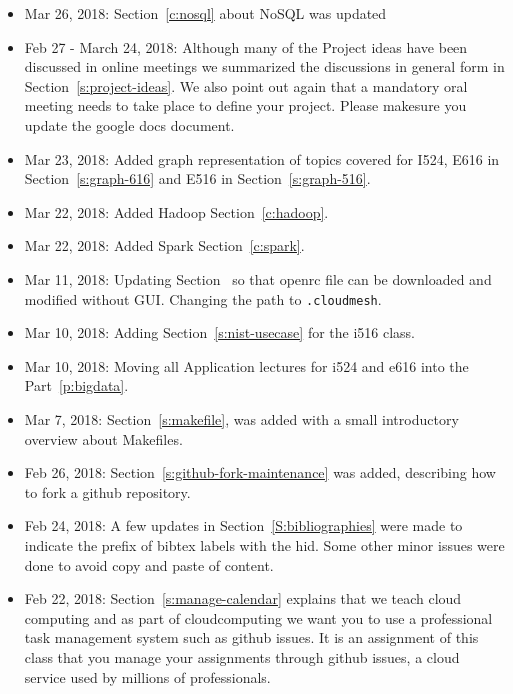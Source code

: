 \begin{itemize}
\item Mar 26, 2018: Section~\ref{c:nosql} about NoSQL was updated

\item Feb 27 - March 24, 2018: Although many of the Project ideas have been discussed
  in online meetings we summarized the discussions in general form in
  Section~\ref{s:project-ideas}.
  We also point out again that a mandatory oral meeting needs to take
  place to define your project. Please makesure you update the google
  docs document.

\item Mar 23, 2018: Added graph representation of topics covered for
  I524, E616 in Section~\ref{s:graph-616} and E516 in Section~\ref{s:graph-516}.

\item Mar 22, 2018: Added Hadoop Section~\ref{c:hadoop}.

\item Mar 22, 2018: Added Spark Section~\ref{c:spark}.

\item Mar 11, 2018: Updating Section~\label{s:chameleon-openstack} so
  that openrc file can be downloaded and modified without
  GUI. Changing the path to \verb|.cloudmesh|.

\item Mar 10, 2018: Adding Section~\ref{s:nist-usecase} for the i516 class.

\item Mar 10, 2018: Moving all Application lectures for i524 and e616
  into the Part~\ref{p:bigdata}.

\item Mar 7, 2018: Section~\ref{s:makefile}, was added with a small
  introductory overview about Makefiles.

\item Feb 26, 2018: Section~\ref{s:github-fork-maintenance} was added,
  describing how to fork a github repository.

\item Feb 24, 2018: A few updates in Section~\ref{S:bibliographies}
  were made to indicate the prefix of bibtex labels with the hid. Some
  other minor issues were done to avoid copy and paste of content.

\item Feb 22, 2018: Section~\ref{s:manage-calendar} explains that we
  teach cloud computing and as part of cloudcomputing we want you to
  use a professional task management system such as github issues. It
  is an assignment of this class that you manage your assignments
  through github issues, a cloud service used by millions of
  professionals.


\end{itemize}
